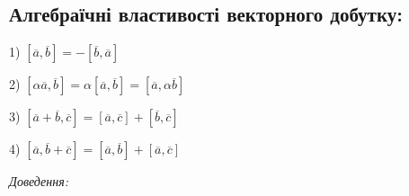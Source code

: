 \subsection*{Алгебраїчні властивості векторного добутку:}

1) $[\overline{a}, \overline{b}] = - [\overline{b}, \overline{a}]$
	
2) $[\alpha\overline{a}, \overline{b}] = \alpha[\overline{a}, \overline{b}] = [\overline{a}, \alpha\overline{b}]$

3) $[\overline{a} + \overline{b}, \overline{c}] = [\overline{a}, \overline{c}] + [\overline{b}, \overline{c}]$
	
4) $[\overline{a}, \overline{b} + \overline{c}] = [\overline{a}, \overline{b}] + [\overline{a}, \overline{c}]$

\textit{Доведення:}

